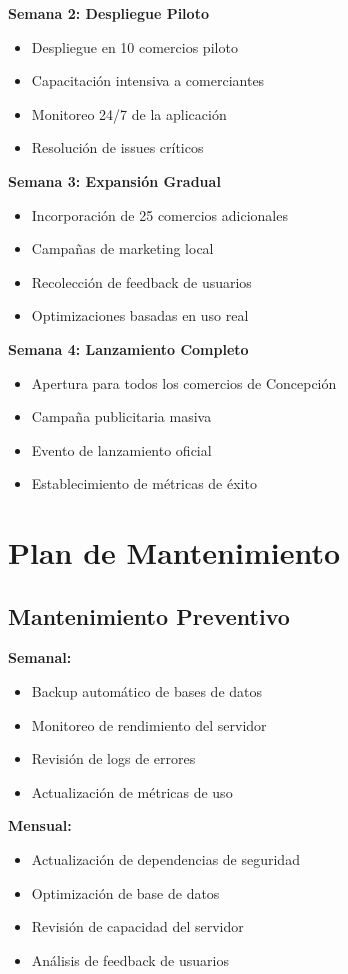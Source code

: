 \documentclass[12pt,a4paper]{report}
\begin{document}
\textbf{Semana 2: Despliegue Piloto}
\begin{itemize}
	\item Despliegue en 10 comercios piloto
	\item Capacitación intensiva a comerciantes
	\item Monitoreo 24/7 de la aplicación
	\item Resolución de issues críticos
\end{itemize}

\textbf{Semana 3: Expansión Gradual}
\begin{itemize}
	\item Incorporación de 25 comercios adicionales
	\item Campañas de marketing local
	\item Recolección de feedback de usuarios
	\item Optimizaciones basadas en uso real
\end{itemize}

\textbf{Semana 4: Lanzamiento Completo}
\begin{itemize}
	\item Apertura para todos los comercios de Concepción
	\item Campaña publicitaria masiva
	\item Evento de lanzamiento oficial
	\item Establecimiento de métricas de éxito
\end{itemize}

\section{Plan de Mantenimiento}

\subsection{Mantenimiento Preventivo}

\textbf{Semanal:}
\begin{itemize}
	\item Backup automático de bases de datos
	\item Monitoreo de rendimiento del servidor
	\item Revisión de logs de errores
	\item Actualización de métricas de uso
\end{itemize}

\textbf{Mensual:}
\begin{itemize}
	\item Actualización de dependencias de seguridad
	\item Optimización de base de datos
	\item Revisión de capacidad del servidor
	\item Análisis de feedback de usuarios
\end{itemize}
\end{document}
